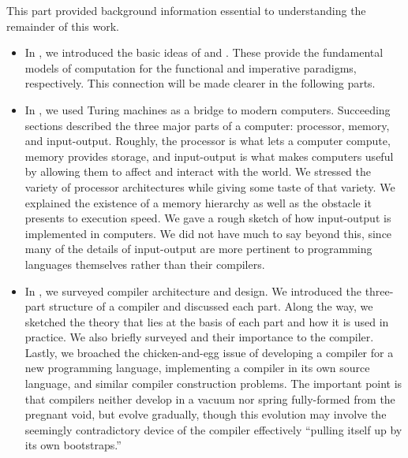 \label{background:conclusion}
This part provided background information essential to understanding the remainder of this work.
\begin{itemize}
\item In , we introduced the basic ideas of \lambdacalc and \TMs. These provide the fundamental models of computation for the functional and imperative paradigms, respectively. This connection will be made clearer in the following parts.

\item In , we used Turing machines as a bridge to modern computers. Succeeding sections described the three major parts of a computer: processor, memory, and input-output. Roughly, the processor is what lets a computer compute, memory provides storage, and input-output is what makes computers useful by allowing them to affect and interact with the world. We stressed the variety of processor architectures while giving some taste of that variety. We explained the existence of a memory hierarchy as well as the obstacle it presents to execution speed. We gave a rough sketch of how input-output is implemented in computers. We did not have much to say beyond this, since many of the details of input-output are more pertinent to programming languages themselves rather than their compilers.

\item In , we surveyed compiler architecture and design. We introduced the three-part structure of a compiler and discussed each part. Along the way, we sketched the theory that lies at the basis of each part and how it is used in practice. We also briefly surveyed \IRs and their importance to the compiler. Lastly, we broached the chicken-and-egg issue of developing a compiler for a new programming language, implementing a compiler in its own source language, and similar compiler construction problems. The important point is that compilers neither develop in a vacuum nor spring fully-formed from the pregnant void, but evolve gradually, though this evolution may involve the seemingly contradictory device of the compiler effectively ``pulling itself up by its own bootstraps.''
\end{itemize}